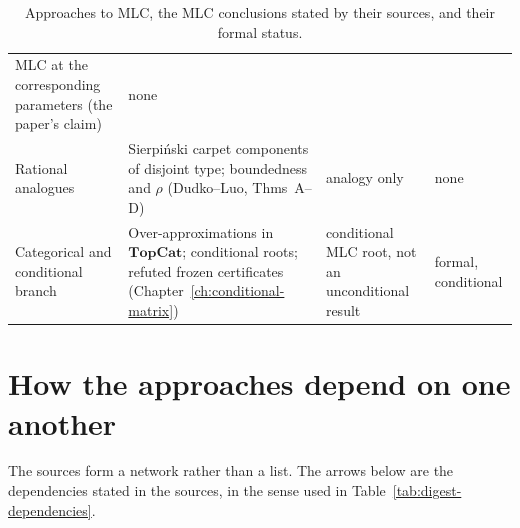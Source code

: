 \begin{table}[ht]
\begin{tabularx}{\textwidth}{@{}>{\raggedright\arraybackslash}p{}>{\raggedright\arraybackslash}X>{\raggedright\arraybackslash}p{}>{\raggedright\arraybackslash}p{}@{}}
MLC at the corresponding parameters (the paper's claim) &
none\\
Rational analogues &
Sierpi\'nski carpet components of disjoint type; boundedness and $\rho$ (Dudko--Luo, Thms~A--D) &
analogy only &
none\\
Categorical and conditional branch &
Over-approximations in $\mathbf{TopCat}$; conditional roots; refuted frozen certificates (Chapter~\ref{ch:conditional-matrix}) &
conditional MLC root, not an unconditional result &
formal, conditional\\
\end{tabularx}
\caption{Approaches to MLC, the MLC conclusions stated by their sources, and their formal status.}
\label{tab:approaches}
\end{table}

\section{How the approaches depend on one another}
\label{sec:approaches-dependencies}

The sources form a network rather than a list.  The arrows below are the dependencies stated in the sources, in the sense
used in Table~\ref{tab:digest-dependencies}.

